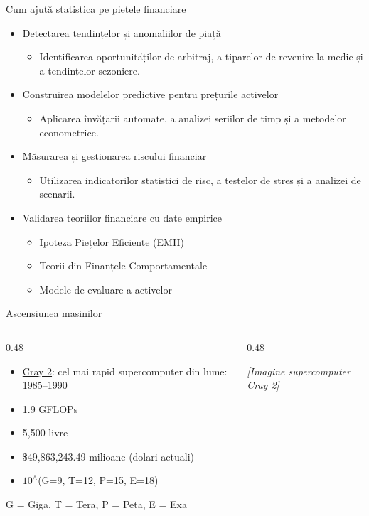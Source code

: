 \documentclass[9pt, aspectratio=169, t]{beamer}
\theoremstyle{definition}
\begin{document}
\begin{frame}{Cum ajută statistica pe piețele financiare}
\begin{itemize}
    \item Detectarea tendințelor și anomaliilor de piață
    \begin{itemize}
        \item Identificarea oportunităților de arbitraj, a tiparelor de revenire la medie și a tendințelor sezoniere.
    \end{itemize}
    \item Construirea modelelor predictive pentru prețurile activelor
    \begin{itemize}
        \item Aplicarea învățării automate, a analizei seriilor de timp și a metodelor econometrice.
    \end{itemize}
    \item Măsurarea și gestionarea riscului financiar
    \begin{itemize}
        \item Utilizarea indicatorilor statistici de risc, a testelor de stres și a analizei de scenarii.
    \end{itemize}
    \item Validarea teoriilor financiare cu date empirice
    \begin{itemize}
        \item Ipoteza Piețelor Eficiente (EMH)
        \item Teorii din Finanțele Comportamentale
        \item Modele de evaluare a activelor
    \end{itemize}
\end{itemize}
\end{frame}

\begin{frame}{Ascensiunea mașinilor}
\begin{columns}[T]
\begin{column}{0.48\textwidth}
\begin{itemize}
    \item \underline{Cray 2}: cel mai rapid supercomputer din lume: 1985--1990
    \item 1.9 GFLOPs
    \item 5,500 livre
    \item \$49,863,243.49 milioane (dolari actuali)
    \item $10^{\wedge}$(G=9, T=12, P=15, E=18)
\end{itemize}

\vspace{0.5cm}

{\small\textcolor{IDAred}{G = Giga, T = Tera, P = Peta, E = Exa}}
\end{column}
\begin{column}{0.48\textwidth}
\begin{center}
    {\small\textit{[Imagine supercomputer Cray 2]}}
\end{center}
\end{column}
\end{columns}
\end{frame}
\end{document}
